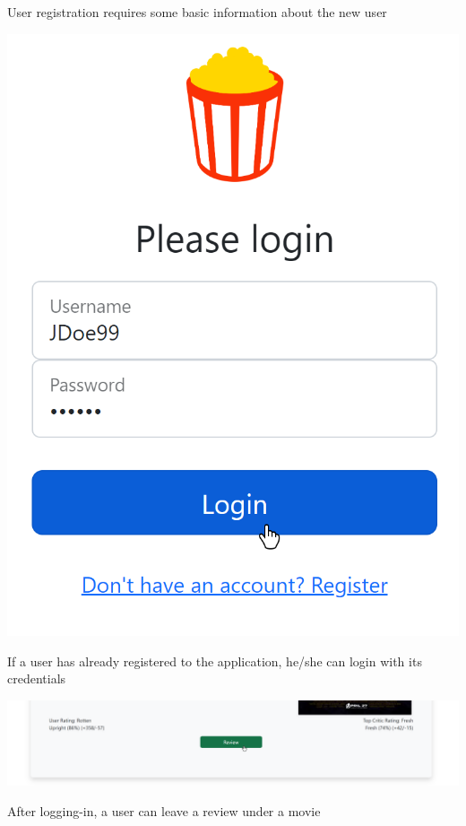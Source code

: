 User registration requires some basic information about the new user
\begin{center}
\includegraphics[scale=0.45]{../../../images/user_manual/login.png} 
\end{center}
\vspace{5pt}

If a user has already registered to the application, he/she can login with its credentials
\begin{center}
\includegraphics[scale=0.45]{../../../images/user_manual/review_button.png}
\end{center}
\vspace{5pt}

 
After logging-in, a user can leave a review under a movie

